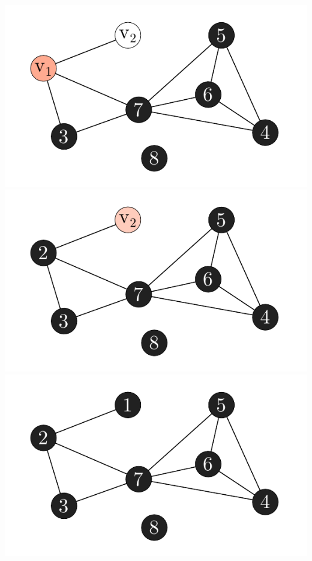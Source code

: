 \documentclass[xcolor=x11names,compress]{beamer}
\begin{document}
\begin{frame}
\begin{center}
\begin{overprint}
			\includegraphics[scale=1.0]{img/execution/mcs/07.pdf}
			\onslide<8>\includegraphics[scale=1.0]{img/execution/mcs/08.pdf}
			\onslide<9>\includegraphics[scale=1.0]{img/execution/mcs/09.pdf}
		\end{overprint}
	\end{center}
\end{frame}
\end{document}
